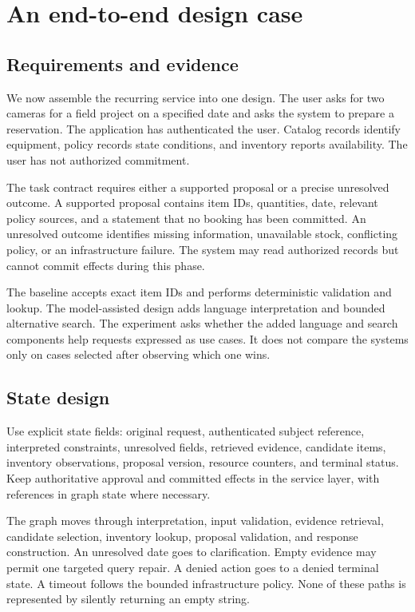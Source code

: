 \chapter{An end-to-end design case}
\section{Requirements and evidence}
We now assemble the recurring service into one design. The user asks for two cameras for a field project on a specified date and asks the system to prepare a reservation. The application has authenticated the user. Catalog records identify equipment, policy records state conditions, and inventory reports availability. The user has not authorized commitment.

The task contract requires either a supported proposal or a precise unresolved outcome. A supported proposal contains item IDs, quantities, date, relevant policy sources, and a statement that no booking has been committed. An unresolved outcome identifies missing information, unavailable stock, conflicting policy, or an infrastructure failure. The system may read authorized records but cannot commit effects during this phase.

The baseline accepts exact item IDs and performs deterministic validation and lookup. The model-assisted design adds language interpretation and bounded alternative search. The experiment asks whether the added language and search components help requests expressed as use cases. It does not compare the systems only on cases selected after observing which one wins.

\section{State design}
Use explicit state fields: original request, authenticated subject reference, interpreted constraints, unresolved fields, retrieved evidence, candidate items, inventory observations, proposal version, resource counters, and terminal status. Keep authoritative approval and committed effects in the service layer, with references in graph state where necessary.

The graph moves through interpretation, input validation, evidence retrieval, candidate selection, inventory lookup, proposal validation, and response construction. An unresolved date goes to clarification. Empty evidence may permit one targeted query repair. A denied action goes to a denied terminal state. A timeout follows the bounded infrastructure policy. None of these paths is represented by silently returning an empty string.

